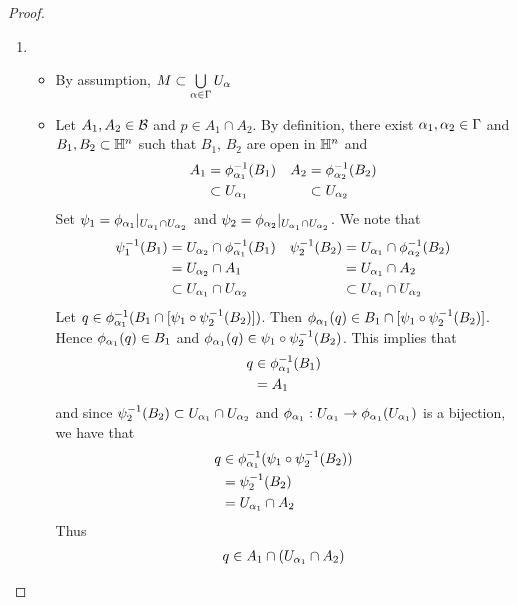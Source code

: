\documentclass{book}
\begin{document}
	\begin{proof} \
		\begin{enumerate}
			\item \begin{itemize}
				\item By assumption, $M \subset \bigcup\limits_{\alpha \in \Gamma} U_{\alpha}$
				\item Let $A_1, A_2 \in \mathcal{B}$ and $p \in A_1 \cap A_2$. By definition, there exist $\alpha_1, \alpha_2 \in \Gamma$ and $B_1, B_2 \subset \mathbb{H}^n$ such that $B_1$, $B_2$ are open in $\mathbb{H}^n$ and 
				\begin{align*}
					A_1 & = \phi_{\alpha_1}^{-1}(B_1)  & A_2 & = \phi_{\alpha_2}^{-1}(B_2) \\
					& \subset U_{\alpha_1}         &     & \subset U_{\alpha_2}
				\end{align*}
				Set $\psi_1 = \phi_{\alpha_1}|_{U_{\alpha_1} \cap U_{\alpha_2}}$ and $\psi_2 = \phi_{\alpha_2}|_{U_{\alpha_1} \cap U_{\alpha_2}}$. We note that  
				\begin{align*}
					\psi_1^{-1}(B_1) & = U_{\alpha_2} \cap \phi_{\alpha_1}^{-1}(B_1) &  \psi_2^{-1}(B_2) & = U_{\alpha_1} \cap \phi_{\alpha_2}^{-1}(B_2) \\
					& = U_{\alpha_2} \cap A_1                    &                   & = U_{\alpha_1} \cap A_2 \\
					& \subset U_{\alpha_1} \cap U_{\alpha_2}        &                   & \subset U_{\alpha_1} \cap U_{\alpha_2}
				\end{align*}
				Let $q \in \phi_{\alpha_1}^{-1}(B_1 \cap [\psi_1 \circ \psi_2^{-1}(B_2)])$. Then $\phi_{\alpha_1}(q) \in B_1 \cap [\psi_1 \circ \psi_2^{-1}(B_2)]$. Hence $\phi_{\alpha_1}(q) \in B_1$ and $\phi_{\alpha_1}(q) \in \psi_1 \circ \psi_2^{-1}(B_2)$. This implies that  
				\begin{align*}
					q 
					& \in \phi_{\alpha_1}^{-1}(B_1) \\
					& = A_1
				\end{align*}
				and since $\psi_2^{-1}(B_2) \subset U_{\alpha_1} \cap U_{\alpha_2}$ and $\phi_{\alpha_1}: U_{\alpha_1} \rightarrow \phi_{\alpha_1}(U_{\alpha_1})$ is a bijection, we have that
				\begin{align*}
					q 
					& \in \phi_{\alpha_1}^{-1}(\psi_1 \circ \psi_2^{-1}(B_2)) \\
					& = \psi_2^{-1}(B_2) \\
					& = U_{\alpha_1} \cap A_2 
				\end{align*} 
				Thus 
				\begin{align*}
					q 
					& \in A_1 \cap (U_{\al_1} \cap A_2) \\

\end{align*}
\end{itemize}
\end{enumerate}
\end{proof}
\end{document}
